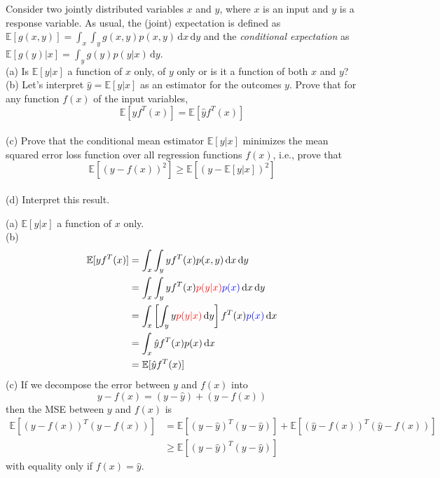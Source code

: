 \documentclass[a4paper]{article}
\newcommand{\Exp}{\mathbb{E}}
\def\r#1{{\color{red}#1}}
\def\b#1{{\color{blue}#1}}
\def\d#1{{\,\mathrm{d}#1}}
\begin{document}
\begin{ExerciseList}
\Exercise[label={ex:conditional-mean}] Consider two jointly distributed variables $x$ and $y$, where $x$ is an input and $y$ is a response variable. As usual, the (joint) expectation is defined as $\Exp[g(x,y)] = \int_x\int_y g(x,y) p(x,y)\d{x}\d{y}$ and the \emph{conditional expectation} as $\Exp[g(y)|x] = \int_y g(y) p(y|x)\d{y}$. \\
(a) Is $\Exp[y|x]$ a function of $x$ only, of $y$ only or is it a function of both $x$ and $y$?\\
(b) Let's interpret $\hat y=\Exp[y|x]$ as an estimator for the outcomes $y$.  Prove that for any function $f(x)$ of the input variables,
$$
\Exp[yf^T(x)] = \Exp[\hat y f^T(x)]
$$
\\
(c) Prove that the conditional mean estimator $\Exp[y|x]$ minimizes the mean squared error loss function over all regression functions $f(x)$, i.e., prove that
$$
\Exp\left[(y-f(x))^2\right] \geq \Exp\left[ (y-\Exp[y|x])^2\right]
$$
\\
(d) Interpret this result.

\Answer[ref={ex:conditional-mean}]
(a) $\Exp[y|x]$ a function of $x$ only.\\
(b)
\begin{align*}
\Exp[yf^T(x)] &= \int_x \int_y yf^T(x) p(x,y)\d{x}\d{y}\\
&= \int_x \int_y yf^T(x) \r{p(y|x)}\b{p(x)} \d{x}\d{y}\\
&= \int_x \left[\int_y y \r{p(y|x)}\d{y}\right] f^T(x) \b{p(x)} \d{x}\\
&= \int_x \hat y f^T(x) p(x) \d{x}\\
&= \Exp[\hat y f^T(x)]
\end{align*}
(c) If we decompose the error between $y$ and $f(x)$ into
$$
y - f(x) = (y-\hat y)+(\hat y - f(x))
$$
then the MSE between $y$ and $f(x)$ is
\begin{align*}
\Exp[(y-f(x))^T(y-f(x))] &= \Exp[(y-\hat y)^T(y-\hat y)] + \Exp[(\hat y - f(x))^T(\hat y-f(x))] \\
    &\geq \Exp[(y-\hat y)^T(y-\hat y)]
\end{align*}
with equality only if $f(x) = \hat y$.








\end{ExerciseList}
\end{document}
